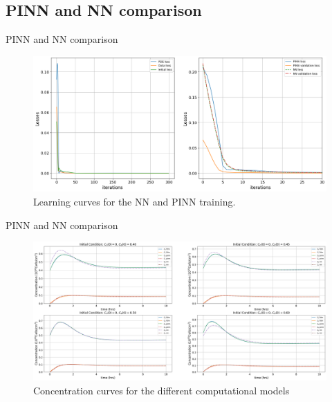 \documentclass[serif,8pt, aspectratio=169]{beamer}
\begin{document}
\subsection{PINN and NN comparison}

\begin{frame}[fragile]{PINN and NN comparison}

    \begin{figure}
        \centering
        \includegraphics[width=0.95\linewidth]{pic/learning_curves.png}
        \caption{Learning curves for the NN and PINN training.}
        \label{fig:enter-label}
    \end{figure}

\end{frame}

\begin{frame}[fragile]{PINN and NN comparison}

    \begin{figure}
        \centering
        \includegraphics[width=0.95\linewidth]{pic/conc_curve_plot.png}
        \caption{Concentration curves for the different computational models}
        \label{fig:enter-label}
    \end{figure}

\end{frame}
\end{document}
